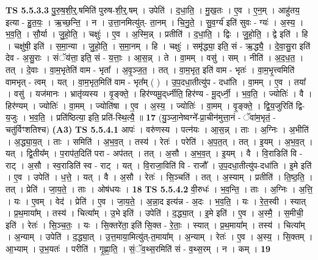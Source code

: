 \documentclass[17pt]{extarticle}
\begin{document}
                  \newline
                                \textbf{ TS 5.5.3.3} \newline
                  पु॒रु॒ष॒शी॒र्॒.षमिति॑ पुरुष-शी॒र्॒.षम् । उपेति॑ । द॒धा॒ति॒ । मु॒ख॒तः । ए॒व । ए॒न॒म् । आहु॑तय॒ इत्या - हु॒त॒यः॒ । ऋ॒च्छ॒न्ति॒ । न । उ॒त्ता॒नमित्यु॑त्- ता॒नम् । चि॒नु॒ते॒ । सु॒व॒र्ग्य॑ इति॑ सुवः - ग्यः॑ । अ॒स्य॒ । भ॒व॒ति॒ । सौ॒र्या । जु॒हो॒ति॒ । चक्षुः॑ । ए॒व । अ॒स्मि॒न्न् । प्रतीति॑ । द॒धा॒ति॒ । द्विः । जु॒हो॒ति॒ । द्वे इति॑ । हि । चक्षु॑षी॒ इति॑ । स॒मा॒न्या । जु॒हो॒ति॒ । स॒मा॒नम् । हि । चक्षुः॑ । समृ॑द्ध्या॒ इति॒ सं - ऋ॒द्ध्यै॒ । दे॒वा॒सु॒रा इति॑ देव - अ॒सु॒राः । संॅय॑त्ता॒ इति॒ सं - य॒त्ताः॒ । आ॒स॒न्न् । ते । वा॒मम् । वसु॑ । सम् । नीति॑ । अ॒द॒ध॒त॒ । तत् । दे॒वाः । वा॒म॒भृतेति॑ वाम - भृता᳚ । अ॒वृ॒ञ्ज॒त॒ । तत् । वा॒म॒भृत॒ इति॑ वाम - भृतः॑ । वा॒म॒भृ॒त्त्वमिति॑ वामभृत् - त्वम् । यत् । वा॒म॒भृत॒मिति॑ वाम - भृत᳚म् ( ) । उ॒प॒दधा॒तीत्यु॑प - दधा॑ति । वा॒मम् । ए॒व । तया᳚ । वसु॑ । यज॑मानः । भ्रातृ॑व्यस्य । वृ॒ङ्क्ते॒ । हिर॑ण्यमू॒द्‌र्ध्नीति॒ हिर॑ण्य - मू॒द्‌र्ध्नी॒ । भ॒व॒ति॒ । ज्योतिः॑ । वै । हिर॑ण्यम् । ज्योतिः॑ । वा॒मम् । ज्योति॑षा । ए॒व । अ॒स्य॒ । ज्योतिः॑ । वा॒मम् । वृ॒ङ्क्ते॒ । द्वि॒य॒जुरिति॑ द्वि-य॒जुः । भ॒व॒ति॒ । प्रति॑ष्ठित्या॒ इति॒ प्रति॑-स्थि॒त्यै॒ ॥ \textbf{  17 } \newline
                  \newline
                      (यु॒ञ्जा॒नेष्वग्ने᳚-प्रा॒चीन॑मुत्ता॒नं - ॅवा॑म॒भृतं॒ - चतु॑र्विꣳशतिश्च)  \textbf{(A3)} \newline \newline
                                \textbf{ TS 5.5.4.1} \newline
                  आपः॑ । वरु॑णस्य । पत्न॑यः । आ॒स॒न्न् । ताः । अ॒ग्निः । अ॒भीति॑ । अ॒द्ध्या॒य॒त् । ताः । समिति॑ । अ॒भ॒व॒त् । तस्य॑ । रेतः॑ । परेति॑ । अ॒प॒त॒त् । तत् । इ॒यम् । अ॒भ॒व॒त् । यत् । द्वि॒तीय᳚म् । प॒राप॑त॒दिति॑ परा - अप॑तत् । तत् । अ॒सौ । अ॒भ॒व॒त् । इ॒यम् । वै । वि॒राडिति॑ वि - राट् । अ॒सौ । स्व॒राडिति॑ स्व - राट् । यत् । वि॒राजा॒विति॑ वि - राजौ᳚ । उ॒प॒दधा॒तीत्यु॑प-दधा॑ति । इ॒मे इति॑ । ए॒व । उपेति॑ । ध॒त्ते॒ । यत् । वै । अ॒सौ । रेतः॑ । सि॒ञ्चति॑ । तत् । अ॒स्याम् । प्रतीति॑ । ति॒ष्ठ॒ति॒ । तत् । प्रेति॑ । जा॒य॒ते॒ । ताः । ओष॑धयः । \textbf{  18} \newline
                  \newline
                                \textbf{ TS 5.5.4.2} \newline
                  वी॒रुधः॑ । भ॒व॒न्ति॒ । ताः । अ॒ग्निः । अ॒त्ति॒ । यः । ए॒वम् । वेद॑ । प्रेति॑ । ए॒व । जा॒य॒ते॒ । अ॒न्ना॒द इत्य॑न्न - अ॒दः । भ॒व॒ति॒ । यः । रे॒त॒स्वी । स्यात् । प्र॒थ॒माया᳚म् । तस्य॑ । चित्या᳚म् । उ॒भे इति॑ । उपेति॑ । द॒द्ध्या॒त् । इ॒मे इति॑ । ए॒व । अ॒स्मै॒ । स॒मीची॒ इति॑ । रेतः॑ । सि॒ञ्च॒तः॒ । यः । सि॒क्तरे॑ता॒ इति॑ सि॒क्त - रे॒ताः॒ । स्यात् । प्र॒थ॒माया᳚म् । तस्य॑ । चित्या᳚म् । अ॒न्याम् । उपेति॑ । द॒द्ध्या॒त् । उ॒त्त॒माया॒मित्यु॑त्-त॒माया᳚म् । अ॒न्याम् । रेतः॑ । ए॒व । अ॒स्य॒ । सि॒क्तम् । आ॒भ्याम् । उ॒भ॒यतः॑ । परीति॑ । गृ॒ह्णा॒ति॒ । सं॒ॅव॒थ्स॒रमिति॑ सं - व॒थ्स॒रम् । न । कम् । \textbf{  19} \newline
\end{document}
